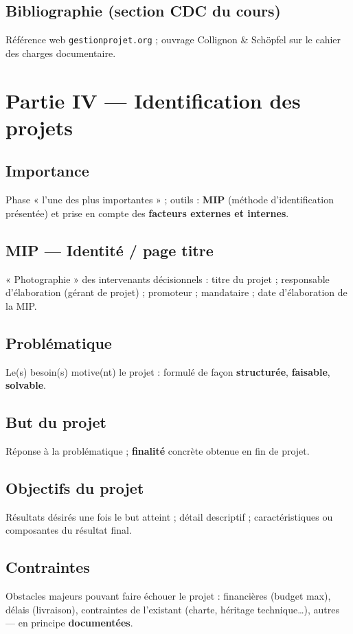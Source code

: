 \documentclass[11pt,a4paper]{article}
\begin{document}
\subsection{Bibliographie (section CDC du cours)}
Référence web \texttt{gestionprojet.org} ; ouvrage Collignon \& Schöpfel sur le cahier des charges documentaire.

\section{Partie IV — Identification des projets}

\subsection{Importance}
Phase « l'une des plus importantes » ; outils : \textbf{MIP} (méthode d'identification présentée) et prise en compte des \textbf{facteurs externes et internes}.

\subsection{MIP — Identité / page titre}
« Photographie » des intervenants décisionnels : titre du projet ; responsable d'élaboration (gérant de projet) ; promoteur ; mandataire ; date d'élaboration de la MIP.

\subsection{Problématique}
Le(s) besoin(s) motive(nt) le projet : formulé de façon \textbf{structurée}, \textbf{faisable}, \textbf{solvable}.

\subsection{But du projet}
Réponse à la problématique ; \textbf{finalité} concrète obtenue en fin de projet.

\subsection{Objectifs du projet}
Résultats désirés une fois le but atteint ; détail descriptif ; caractéristiques ou composantes du résultat final.

\subsection{Contraintes}
Obstacles majeurs pouvant faire échouer le projet : financières (budget max), délais (livraison), contraintes de l'existant (charte, héritage technique\ldots), autres — en principe \textbf{documentées}.
\end{document}
